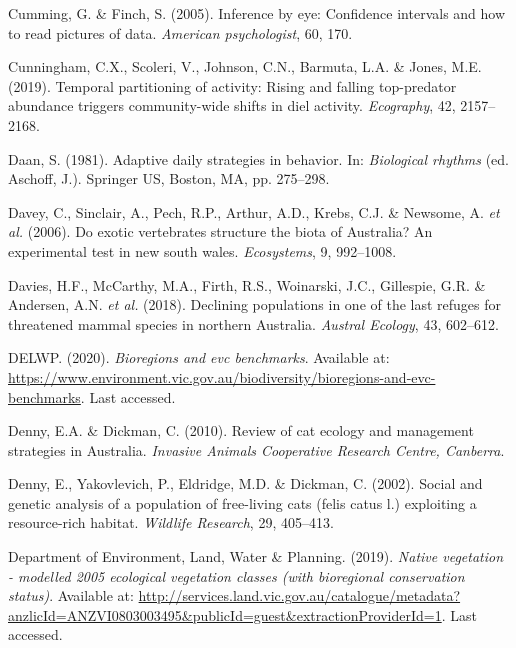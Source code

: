 \documentclass[11pt,a4paper,titlepage,twoside,openright]{style/unimelbthesis}
\begin{document}
\begin{mainmatter}
\leavevmode\hypertarget{ref-cumming2005inference}{}%
Cumming, G. \& Finch, S. (2005). Inference by eye: Confidence intervals and how to read pictures of data. \emph{American psychologist}, 60, 170.

\leavevmode\hypertarget{ref-cunningham2019temporal}{}%
Cunningham, C.X., Scoleri, V., Johnson, C.N., Barmuta, L.A. \& Jones, M.E. (2019). Temporal partitioning of activity: Rising and falling top-predator abundance triggers community-wide shifts in diel activity. \emph{Ecography}, 42, 2157--2168.

\leavevmode\hypertarget{ref-daan1981adaptive}{}%
Daan, S. (1981). Adaptive daily strategies in behavior. In: \emph{Biological rhythms} (ed. Aschoff, J.). Springer US, Boston, MA, pp. 275--298.

\leavevmode\hypertarget{ref-davey2006exotic}{}%
Davey, C., Sinclair, A., Pech, R.P., Arthur, A.D., Krebs, C.J. \& Newsome, A. \emph{et al.} (2006). Do exotic vertebrates structure the biota of Australia? An experimental test in new south wales. \emph{Ecosystems}, 9, 992--1008.

\leavevmode\hypertarget{ref-davies2018declining}{}%
Davies, H.F., McCarthy, M.A., Firth, R.S., Woinarski, J.C., Gillespie, G.R. \& Andersen, A.N. \emph{et al.} (2018). Declining populations in one of the last refuges for threatened mammal species in northern Australia. \emph{Austral Ecology}, 43, 602--612.

\leavevmode\hypertarget{ref-delwp2020bioregions}{}%
DELWP. (2020). \emph{Bioregions and evc benchmarks}. Available at: \url{https://www.environment.vic.gov.au/biodiversity/bioregions-and-evc-benchmarks}. Last accessed.

\leavevmode\hypertarget{ref-denny2010review}{}%
Denny, E.A. \& Dickman, C. (2010). Review of cat ecology and management strategies in Australia. \emph{Invasive Animals Cooperative Research Centre, Canberra}.

\leavevmode\hypertarget{ref-denny2002social}{}%
Denny, E., Yakovlevich, P., Eldridge, M.D. \& Dickman, C. (2002). Social and genetic analysis of a population of free-living cats (felis catus l.) exploiting a resource-rich habitat. \emph{Wildlife Research}, 29, 405--413.

\leavevmode\hypertarget{ref-NV2005_EVCBCS}{}%
Department of Environment, Land, Water \& Planning. (2019). \emph{Native vegetation - modelled 2005 ecological vegetation classes (with bioregional conservation status)}. Available at: \url{http://services.land.vic.gov.au/catalogue/metadata?anzlicId=ANZVI0803003495\&publicId=guest\&extractionProviderId=1}. Last accessed.


\end{mainmatter}
\end{document}
